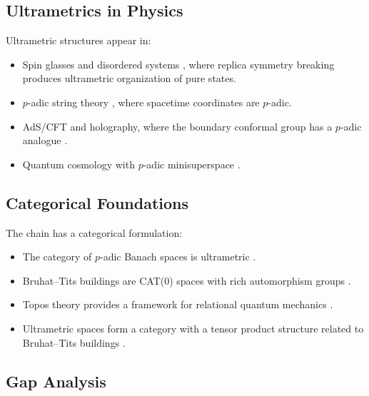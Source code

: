 \documentclass[12pt,a4paper]{article}
\theoremstyle{definition}
\begin{document}
\subsection{Ultrametrics in Physics}

Ultrametric structures appear in:
\begin{itemize}[nosep]
\item Spin glasses and disordered systems \cite{mezard1987spin}, where replica symmetry breaking produces ultrametric organization of pure states.
\item $p$-adic string theory \cite{volovich1987padic,freund1987padic,brekke1994padic}, where spacetime coordinates are $p$-adic.
\item AdS/CFT and holography, where the boundary conformal group has a $p$-adic analogue \cite{gubser2017padic,heydeman2018padic}.
\item Quantum cosmology with $p$-adic minisuperspace \cite{dragovich2019padic}.
\end{itemize}

\subsection{Categorical Foundations}

The chain has a categorical formulation:
\begin{itemize}[nosep]
\item The category of $p$-adic Banach spaces is ultrametric \cite{schneider2013nonarchimedean}.
\item Bruhat--Tits buildings are CAT(0) spaces with rich automorphism groups \cite{abramenko2008buildings}.
\item Topos theory provides a framework for relational quantum mechanics \cite{doering2011topos}.
\item Ultrametric spaces form a category with a tensor product structure related to Bruhat--Tits buildings \cite{scholze2012perfectoid}.
\end{itemize}

\subsection{Gap Analysis}
\end{document}
